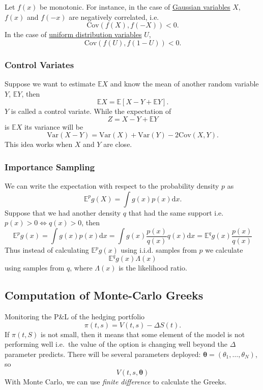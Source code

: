 \documentclass[twocolumn,landscape,10pt]{article}
\theoremstyle{definition}
\begin{document}
Let $f(x)$ be monotonic. 
For instance, in the case of \underline{Gaussian variables} $X$, 
$f(x)$ and $f(-x)$ are negatively correlated, i.e.\
\[
    \text{Cov}(f(X), f(-X)) < 0.
\]
In the case of \underline{uniform distribution variables} $U$, 
\[
    \text{Cov}(f(U), f(1-U)) < 0.
\]

\subsubsection{Control Variates}

Suppose we want to estimate $\mathbb{E}X$ and know the mean of another random
variable $Y$, $\mathbb{E}Y$, then
\[
    \mathbb{E}X=\mathbb{E}[X-Y+\mathbb{E}Y].
\]
$Y$ is called a control variate. While the expectation of
\[
    Z=X-Y+\mathbb{E}Y
\]
is $\mathbb{E}X$ its variance will be
\[
    \text{Var}(X-Y)=\text{Var}(X)+\text{Var}(Y)-2\text{Cov}(X,Y).
\]
This idea works when $X$ and $Y$ are close.

\subsubsection{Importance Sampling}

We can write the expectation with respect to the probability density $p$ as
\[
    \mathbb{E}^pg(X)=\int g(x)p(x)\mathrm{d}x.
\]
Suppose that we had another density $q$ that had the same support i.e.\
$p(x)>0\iff q(x)>0$, then
\[
    \mathbb{E}^pg(x)
    =\int g(x)p(x)\mathrm{d}x
    =\int g(x) \frac{p(x)}{q(x)}q(x)\mathrm{d}x
    =\mathbb{E}^qg(x) \frac{p(x)}{q(x)}
\]
Thus instead of calculating $\mathbb{E}^pg(x)$ using i.i.d. samples from $p$ we
calculate
\[
    \mathbb{E}^qg(x)\Lambda(x)
\]
using samples from $q$, where $\Lambda(x)$ is the likelihood ratio.

\subsection{Computation of Monte-Carlo Greeks}

Monitoring the P\&L of the hedging portfolio
\[
    \pi(t,s)=V(t,s)-\Delta S(t).
\]
If $\pi(t,S)$ is not small, then it means that some element of the model is not
performing well i.e.\ the value of the option is changing well beyond the
$\Delta$ parameter predicts. There will be several parameters deployed:
$\pmb{\theta}=\left(\theta_1,\ldots,\theta_N\right)$, so 
\[
    V(t,s,\pmb{\theta})
\]
With Monte Carlo, we can use \emph{finite difference} to calculate the Greeks.
\end{document}
